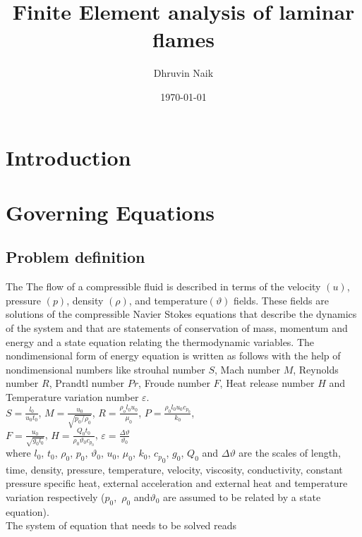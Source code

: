 \documentclass[11pt,a4paper]{article}
\begin{document}
\title{Finite Element analysis of laminar flames}
\author{Dhruvin Naik}
\date{\today}
\maketitle
\begin{abstract}
\end{abstract}
\section{Introduction}
\section{Governing Equations}
\subsection{Problem definition}
The The flow of a compressible fluid is described in terms of the velocity $(u)$, pressure $(p)$, density $(\rho)$, and temperature$(\vartheta)$ fields. These fields are solutions of the compressible Navier Stokes equations that describe the dynamics of the system
and that are statements of conservation of mass, momentum and energy and a state equation relating the thermodynamic variables. The nondimensional form of energy equation is written as follows with the help of nondimensional numbers like strouhal number $S$, Mach number $M$, Reynolds number $R$, Prandtl number $Pr$, Froude number $F$, Heat release number $H$ and Temperature variation number $\varepsilon$. \\
$S=\frac{l_0}{u_0t_0}$,  $M=\frac{u_0}{\sqrt{p_0/\rho_0}}$, $R=\frac{\rho_ol_0u_0}{\mu_0}$, $P=\frac{\rho_0l_0u_0c_{p_0}}{k_0}$, \\ $F=\frac{u_0}{\sqrt{g_0l_0}}$, $H=\frac{Q_0t_0}{\rho_0\vartheta_0c_{p_0}}$, $\varepsilon=\frac{{\Delta}\vartheta}{\vartheta_0}$\\
where $l_0$, $t_0$, $\rho_0$, $p_0$, $\vartheta_0$, $u_0$, $\mu_0$, $k_0$, ${c_p}_0$, $g_0$, $Q_0$ and $\Delta\vartheta$ are the scales of length,
time, density, pressure, temperature, velocity, viscosity, conductivity, constant
pressure specific heat, external acceleration and external heat and temperature
variation respectively ($p_0,$ $\rho_0$ and$ \vartheta_0$ are assumed to be related by a state
equation).\\
The system of equation that needs to be solved reads
\end{document}
